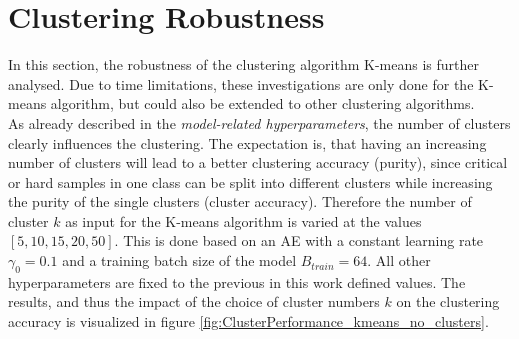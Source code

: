 \documentclass[12pt,DIV14,BCOR12mm,a4paper,footexclude,headinclude,halfparskip-,twoside,openright,cleardoubleempty,idxtotoc,bibtotoc,listtotoc,abstracton]{scrreprt} %
\numberwithin{equation}{chapter}
\begin{document}
\section{Clustering Robustness}
In this section, the robustness of the clustering algorithm K-means is further analysed. Due to time limitations, these investigations are only done for the K-means algorithm, but could also be extended to other clustering algorithms.\\
As already described in the \textit{model-related hyperparameters}, the number of clusters clearly influences the clustering. The expectation is, that having an increasing number of clusters will lead to a better clustering accuracy (purity), since critical or hard samples in one class can be split into different clusters while increasing the purity of the single clusters (cluster accuracy). Therefore the number of cluster $k$ as input for the K-means algorithm is varied at the values $[5, 10, 15, 20, 50]$. This is done based on an AE with a constant learning rate $\gamma_0=0.1$ and a training batch size of the model $B_{train}=64$. All other hyperparameters are fixed to the previous in this work defined values. The results, and thus the impact of the choice of cluster numbers $k$ on the clustering accuracy is visualized in figure \ref{fig:ClusterPerformance_kmeans_no_clusters}.
\end{document}
